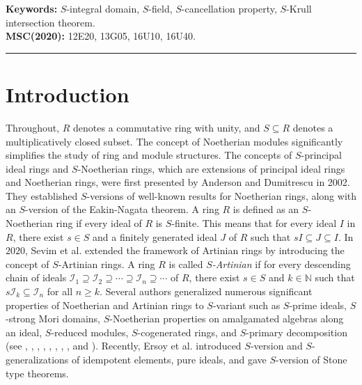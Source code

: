 \documentclass[11pt]{article}
\begin{document}
	\textbf{Keywords:}	$S$-integral domain, $S$-field, $S$-cancellation property, $S$-Krull intersection theorem.\\
	\textbf{MSC(2020):} 12E20, 13G05, 16U10, 16U40.
	\hrule
	\section{Introduction}
	Throughout, $R$ denotes  a commutative ring with unity, and $S\subseteq R$ denotes a multiplicatively closed subset. The concept of Noetherian modules significantly simplifies the study of ring and module structures. The concepts of $S$-principal ideal rings and $S$-Noetherian rings, which are extensions of principal ideal rings and Noetherian rings, were first presented by Anderson and Dumitrescu \cite{ad02} in 2002. They established $S$-versions of well-known results for Noetherian rings, along with an $S$-version of the Eakin-Nagata theorem. A ring $R$ is defined as an $S$-Noetherian ring if every ideal of $R$ is $S$-finite. This means that for every ideal $I$ in $R$, there exist $s\in S$ and a finitely generated ideal $J$ of $R$ such that $sI\subseteq J\subseteq I$. In $2020$, Sevim et al. \cite{es20} extended the framework of Artinian rings by introducing the concept of $S$-Artinian rings. A ring $R$ is called  \textit{$S$-Artinian} if for every descending chain of ideals $\mathcal{I}_{1}\supseteq \mathcal{I}_{2}\supseteq\cdots\supseteq \mathcal{I}_{n}\supseteq\cdots$ of $R$, there exist $s \in S$ and $k \in \mathbb{N}$ such that $s \mathcal{I}_{k} \subseteq \mathcal{I}_n$ for all $n \geq k$.
	Several authors generalized numerous significant properties of Noetherian and Artinian rings to $S$-variant such as $S$-prime ideals, $S$-strong Mori domains, $S$-Noetherian properties on amalgamated algebras along an ideal, $S$-reduced modules, $S$-cogenerated rings, and $S$-primary decomposition (see \cite{ah18}, \cite{ah20}, \cite{ah22}, \cite{hk14}, \cite{jw14}, \cite{ap20}, \cite{es20}, \cite{ts23}, and \cite{ts24}). Recently, Ersoy et al. \cite{ba24} introduced $S$-version and $S$-generalizations of idempotent elements, pure ideals, and gave $S$-version of Stone type theorems.
	
\end{document}
